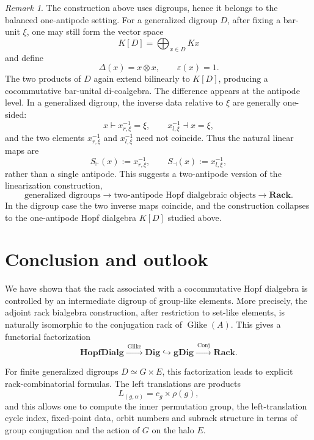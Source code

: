 \documentclass[11pt]{article}
\theoremstyle{plain}
\theoremstyle{definition}
\theoremstyle{remark}
\newtheorem{remark}[theorem]{Remark}
\DeclareMathOperator{\Glike}{Glike}
\DeclareMathOperator{\Conj}{Conj}
\begin{document}
	\begin{remark}\label{rem:two-antipode-outlook}
		The construction above uses digroups, hence it belongs to the balanced
		one-antipode setting. For a generalized digroup \(D\), after fixing a
		bar-unit \(\xi\), one may still form the vector space
		\[
		K[D]=\bigoplus_{x\in D}Kx
		\]
		and define
		\[
		\Delta(x)=x\otimes x,
		\qquad
		\varepsilon(x)=1.
		\]
		The two products of \(D\) again extend bilinearly to \(K[D]\), producing a
		cocommutative bar-unital di-coalgebra. The difference appears at the
		antipode level. In a generalized digroup, the inverse data relative to
		\(\xi\) are generally one-sided:
		\[
		x\vdash x^{-1}_{r,\xi}=\xi,
		\qquad
		x^{-1}_{l,\xi}\dashv x=\xi,
		\]
		and the two elements \(x^{-1}_{r,\xi}\) and \(x^{-1}_{l,\xi}\) need not
		coincide. Thus the natural linear maps are
		\[
		S_{\vdash}(x):=x^{-1}_{r,\xi},
		\qquad
		S_{\dashv}(x):=x^{-1}_{l,\xi},
		\]
		rather than a single antipode. This suggests a two-antipode version of the
		linearization construction,
		\[
		\text{generalized digroups}
		\longrightarrow
		\text{two-antipode Hopf dialgebraic objects}
		\longrightarrow
		\mathbf{Rack}.
		\]
		In the digroup case the two inverse maps coincide, and the construction
		collapses to the one-antipode Hopf dialgebra \(K[D]\) studied above.
	\end{remark}
	
	\section{Conclusion and outlook}
	
	We have shown that the rack associated with a cocommutative Hopf dialgebra is
	controlled by an intermediate digroup of group-like elements. More precisely,
	the adjoint rack bialgebra construction, after restriction to set-like
	elements, is naturally isomorphic to the conjugation rack of
	\(\Glike(A)\). This gives a functorial factorization
	\[
	\mathbf{HopfDialg}
	\xrightarrow{\ \Glike\ }
	\mathbf{Dig}
	\hookrightarrow
	\mathbf{gDig}
	\xrightarrow{\ \Conj\ }
	\mathbf{Rack}.
	\]
	
	For finite generalized digroups \(D\simeq G\times E\), this factorization leads
	to explicit rack-combinatorial formulas. The left translations are products
	\[
	L_{(g,\alpha)}=c_g\times \rho(g),
	\]
	and this allows one to compute the inner permutation group, the
	left-translation cycle index, fixed-point data, orbit numbers and subrack
	structure in terms of group conjugation and the action of \(G\) on the halo
	\(E\).
	
\end{document}
